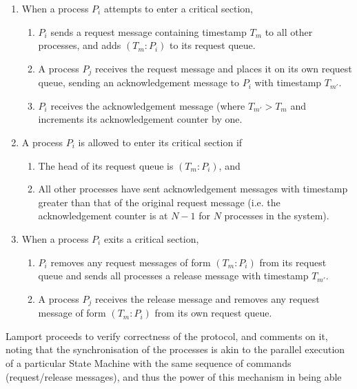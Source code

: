 \documentclass[11pt]{article}
\begin{document}
\begin{enumerate}
    \item When a process \( P_i \) attempts to enter a critical section,
    \begin{enumerate}
        \item \( P_i \) sends a request message containing timestamp \( T_m \)
            to all other processes, and adds \( (T_m:P_i) \) to its request
            queue.
        \item A process \( P_j \) receives the request message and places it on
            its own request queue, sending an acknowledgement message to 
            \( P_i \) with timestamp \( T_{m'} \).
        \item \( P_i \) receives the acknowledgement message (where \( T_{m'} >
            T_m \) and increments its acknowledgement counter by one.
    \end{enumerate}
    \item A process \( P_i \) is allowed to enter its critical section if
    \begin{enumerate}[noitemsep]
        \item The head of its request queue is \( (T_m:P_i) \), and 
        \item All other processes have sent acknowledgement messages with
            timestamp greater than that of the original request message (i.e.
            the acknowledgement counter is at \( N-1 \) for \( N \) processes
            in the system).
    \end{enumerate}
    \item When a process \( P_i \) exits a critical section,
    \begin{enumerate}[noitemsep]
        \item \( P_i \) removes any request messages of form \( (T_m:P_i) \)
            from its request queue and sends all processes a release message
            with timestamp \( T_{m'} \).
        \item A process \( P_j \) receives the release message and removes any
            request message of form \( (T_m:P_i) \) from its own request queue.
    \end{enumerate}
\end{enumerate}
\fi
Lamport proceeds to verify correctness of the protocol, and comments on it,
noting that the synchronisation of the processes is akin to the parallel
execution of a particular State Machine with the same sequence of commands
(request/release messages), and thus the power of this mechanism in being able
\end{document}
